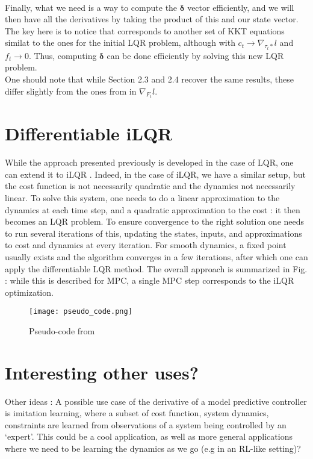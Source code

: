 \documentclass[a4paper,11pt]{article}
\begin{document}
\\Finally, what we need is a way to compute the $ \bm{\delta}$ vector efficiently, and we will then have all the derivatives by taking the product of this and our state vector. The key here is to notice that  corresponds to another set of KKT equations similat to the ones for the initial LQR problem, although with $c_t \rightarrow \nabla_{\tau_t*}l$ and $f_t \rightarrow 0$. Thus, computing $\bm{\delta}$ can be done efficiently by solving this new LQR problem.
\\One should note that while Section 2.3 and 2.4 recover the same results, these differ slightly from the ones from \cite{amos2018differentiable} in $\nabla_{F_t}l$.

\section{Differentiable iLQR}
While the approach presented previously is developed in the case of LQR, one can extend it to iLQR \citep{li2004iterative}. Indeed, in the case of iLQR, we have a similar setup, but the cost function is not necessarily quadratic and the dynamics not necessarily linear. To solve this system, one needs to do a linear approximation to the dynamics at each time step, and a quadratic approximation to the cost : it then becomes an LQR problem. To ensure convergence to the right solution one needs to run several iterations of this, updating the states, inputs, and approximations to cost and dynamics at every iteration. For smooth dynamics, a fixed point usually exists and the algorithm converges in a few iterations, after which one can apply the differentiable LQR method. The overall approach is summarized in Fig.  : while this is described for MPC, a single MPC step corresponds to the iLQR optimization.
%
\begin{figure}[t!]
    \centering
    \texttt{[image: pseudo\_code.png]}
    \caption{Pseudo-code from \citep{amos2018differentiable}}
    \label{fig:my_label}
\end{figure}
%
\section{Interesting other uses?}
%
Other ideas : A possible use case of the derivative of a model predictive controller is imitation learning, where a subset of {cost function, system dynamics, constraints} are learned from observations of a system being controlled by an ‘expert’. This could be a cool application, as well as more general applications where we need to be learning the dynamics as we go (e.g in an RL-like setting)?





\end{document}
